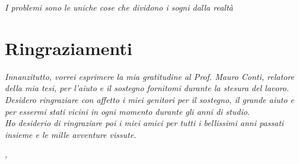 \cleardoublepage
{}
\thispagestyle{empty}

\begin{flushright}{
	\slshape
	I problemi sono le uniche cose che dividono i sogni dalla realtà} \\
	\medskip
\end{flushright}



\begingroup
\let\clearpage\relax
\let\cleardoublepage\relax
\let\cleardoublepage\relax

\section*{Ringraziamenti}

\noindent \textit{Innanzitutto, vorrei esprimere la mia gratitudine al Prof.
Mauro Conti, relatore della mia tesi, per l'aiuto e il sostegno fornitomi
durante la stesura del lavoro.}\\

\noindent \textit{Desidero ringraziare con affetto i miei genitori per il
sostegno, il grande aiuto e per essermi stati vicini in ogni momento durante
gli anni di studio.}\\

\noindent \textit{Ho desiderio di ringraziare poi i miei amici per tutti i
bellissimi anni passati insieme e le mille avventure vissute.}\\
\bigskip

\noindent\textit{\myLocation, \myTime}
\hfill \myName

\endgroup
